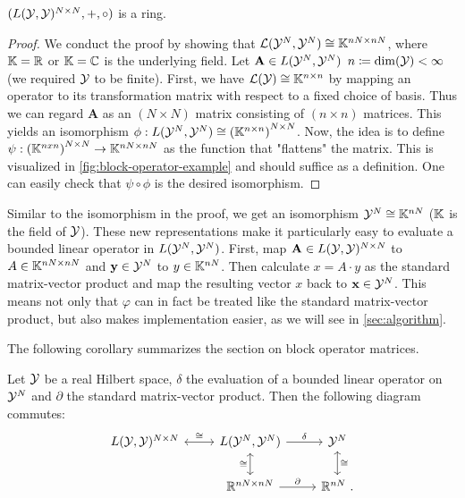 \begin{theorem}
	\label{theo:product-space-ring}
	$(L(\mathcal{Y}, \mathcal{Y})^{N\times N}, +, \circ)$ is a ring.
\end{theorem}
\begin{proof}
	We conduct the proof by showing that $\mathcal{L}(\mathcal{Y}^N, \mathcal{Y}^N) \cong \mathbb{K}^{nN \times nN}$, where $\mathbb{K} = \mathbb{R}$ or $\mathbb{K} = \mathbb{C}$ is the underlying field.
	Let $\mathbf{A} \in L(\mathcal{Y}^N, \mathcal{Y}^N)$ $n \coloneqq \mathrm{dim}(\mathcal{Y}) < \infty$ (we required $\mathcal{Y}$ to be finite).
	First, we have $\mathcal{L}(\mathcal{Y}) \cong \mathbb{K}^{n\times n}$ by mapping an operator to its transformation matrix with respect to a fixed choice of basis.
	Thus we can regard $\mathbf{A}$ as an $(N \times N)$ matrix consisting of $(n \times n)$ matrices.
	This yields an isomorphism $\phi: L(\mathcal{Y}^N, \mathcal{Y}^N) \cong \left(\mathbb{K}^{n\times n}\right)^{N \times N}$.
	Now, the idea is to define $\psi:\left(\mathbb{K}^{nxn}\right)^{N \times N} \rightarrow \mathbb{K}^{nN \times nN}$ as the function that "flattens" the matrix.
	This is visualized in \cref{fig:block-operator-example} and should suffice as a definition.
	One can easily check that $\psi \circ \phi$ is the desired isomorphism.
\end{proof}



Similar to the isomorphism in the proof, we get an isomorphism $\mathcal{Y}^N \cong \mathbb{K}^{nN}$ ($\mathbb{K}$ is the field of $\mathcal{Y}$).
These new representations make it particularly easy to evaluate a bounded linear operator in $L(\mathcal{Y}^N, \mathcal{Y}^N)$.
First, map $\mathbf{A} \in L(\mathcal{Y}, \mathcal{Y})^{N\times N}$ to $A \in \mathbb{K}^{nN \times nN}$ and $\mathbf{y} \in \mathcal{Y}^N$ to $y \in \mathbb{K}^{nN}$.
Then calculate $x = A \cdot y$ as the standard matrix-vector product and map the resulting vector $x$ back to $\mathbf{x} \in \mathcal{Y}^N$.
This means not only that $\varphi$ can in fact be treated like the standard matrix-vector product, but also makes implementation easier, as we will see in \cref{sec:algorithm}.

The following corollary summarizes the section on block operator matrices.
\begin{corollary}
	\label{cor:matrix-vector-equivalence}
	\label{cor:matrix-ring-equivalence}
	Let $\mathcal{Y}$ be a real Hilbert space, $\delta$ the evaluation of a bounded linear operator on $\mathcal{Y}^N$ and $\partial$ the standard matrix-vector product. 
	Then the following diagram commutes:
	\begin{equation}
		\begin{tikzcd}
		 	L(\cY, \cY)^{N\times N} \arrow[leftrightarrow]{r}{\cong} &L(\cY^N, \cY^N) \arrow{r}{\delta} \arrow[swap, leftrightarrow]{d}{\cong} & \cY^N \arrow[leftrightarrow]{d}{\cong} \\%
			&\R^{nN \times nN} \arrow{r}{\partial}& \R^{nN} \ .
		\end{tikzcd}
	\end{equation}
\end{corollary}